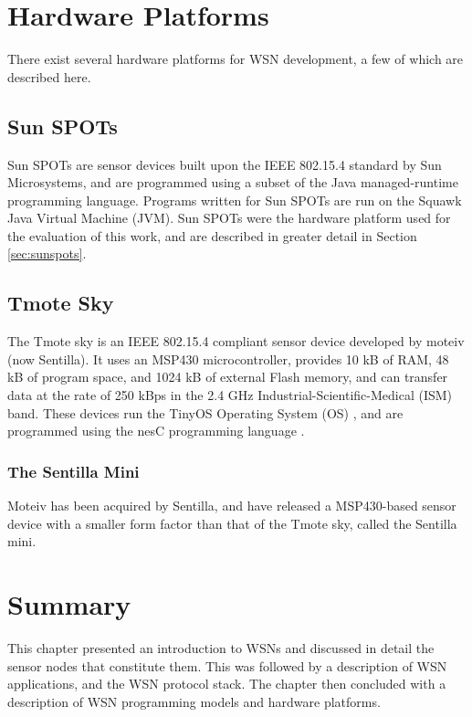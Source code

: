 \section{Hardware Platforms}

There exist several hardware platforms for WSN development, a few of which are
described here.

\subsection{Sun SPOTs}

Sun SPOTs \cite{simon_squawk:2006,sun_developer:2008} are sensor devices built
upon the IEEE 802.15.4 standard by Sun
Microsystems, and are programmed using a subset of the Java managed-runtime
programming
language. Programs written for Sun SPOTs are run on the Squawk Java Virtual
Machine (JVM). Sun SPOTs were the hardware platform used for the evaluation of
this work, and are described in greater detail in Section \ref{sec:sunspots}.

\subsection{Tmote Sky}

The Tmote sky is an IEEE 802.15.4 compliant sensor device
\cite{tmote_sky_brochure:xxxx} developed by moteiv
(now Sentilla). It uses an MSP430 microcontroller, provides 10 kB of RAM,
48 kB of program space, and 1024 kB of external Flash memory, and can transfer
data at the rate of 250 kBps in the 2.4 GHz Industrial-Scientific-Medical (ISM)
band. These devices run the TinyOS Operating System (OS) \cite{levis_tinyos:2005}, and are programmed
using the nesC programming language \cite{gay_nesc}.

\subsubsection{The Sentilla Mini}

Moteiv has been acquired by Sentilla, and have released a MSP430-based sensor
device with a smaller form factor than that of the Tmote sky, called the
Sentilla mini.

\section{Summary}
This chapter presented an introduction to WSNs and discussed in detail the 
sensor nodes that constitute them. This was followed by a description of WSN
applications, and the
WSN protocol stack. The chapter then concluded with a description of WSN
programming models and hardware platforms.


